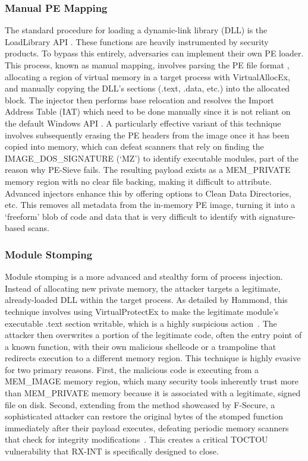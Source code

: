 \documentclass[journal]{IEEEtran}
\begin{document}
\subsubsection{Manual PE Mapping}
The standard procedure for loading a dynamic-link library (DLL) is the LoadLibrary API \cite{microsoftDLLs}. These functions are heavily instrumented by security products. To bypass this entirely, adversaries can implement their own PE loader. This process, known as manual mapping, involves parsing the PE file format \cite{fewer2008reflective}, allocating a region of virtual memory in a target process with VirtualAllocEx, and manually copying the DLL's sections (.text, .data, etc.) into the allocated block. The injector then performs base relocation and resolves the Import Address Table (IAT) which need to be done manually since it is not reliant on the default Windows API \cite{IredTeamModuleStomping}. A particularly effective variant of this technique involves subsequently erasing the PE headers from the image once it has been copied into memory, which can defeat scanners that rely on finding the IMAGE\_DOS\_SIGNATURE (`MZ') to identify executable modules, part of the reason why PE-Sieve fails. The resulting payload exists as a MEM\_PRIVATE memory region with no clear file backing, making it difficult to attribute. Advanced injectors enhance this by offering options to Clean Data Directories, etc. This removes all metadata from the in-memory PE image, turning it into a `freeform' blob of code and data that is very difficult to identify with signature-based scans.
\subsubsection{Module Stomping}
Module stomping is a more advanced and stealthy form of process injection. Instead of allocating new private memory, the attacker targets a legitimate, already-loaded DLL within the target process. As detailed by Hammond, this technique involves using VirtualProtectEx \cite{microsoftVirtualProtectEx} to make the legitimate module's executable .text section writable, which is a highly suspicious action~\cite{Orr2019}. The attacker then overwrites a portion of the legitimate code, often the entry point of a known function, with their own malicious shellcode or a trampoline that redirects execution to a different memory region.
This technique is highly evasive for two primary reasons. First, the malicious code is executing from a MEM\_IMAGE memory region, which many security tools inherently trust more than MEM\_PRIVATE memory because it is associated with a legitimate, signed file on disk. Second, extending from the method showcased by F-Secure, a sophisticated attacker can restore the original bytes of the stomped function immediately after their payload executes, defeating periodic memory scanners that check for integrity modifications~\cite{Orr2019}. This creates a critical TOCTOU vulnerability that RX-INT is specifically designed to close.
\end{document}
